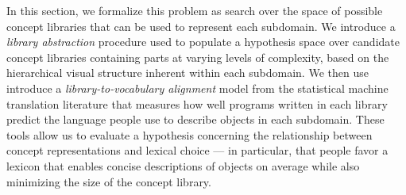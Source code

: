 \documentclass[10pt,letterpaper]{article}
\begin{document}
In this section, we formalize this problem as search over the space of possible concept libraries that can be used to represent each subdomain. We introduce a \textit{library abstraction} procedure used to populate a hypothesis space over candidate concept libraries containing parts at varying levels of complexity, based on the hierarchical visual structure inherent within each subdomain. We then use introduce a \textit{library-to-vocabulary alignment} model from the statistical machine translation literature that measures how well programs written in each library predict the language people use to describe objects in each subdomain.
These tools allow us to evaluate a hypothesis concerning the relationship between concept representations and lexical choice --- in particular, that people favor a lexicon that enables concise descriptions of objects on average while also minimizing the size of the concept library.




\end{document}
